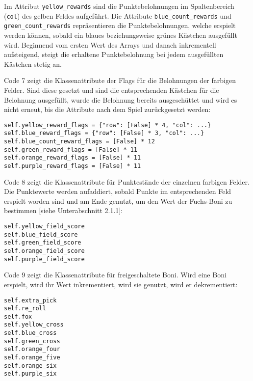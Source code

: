 Im Attribut \texttt{yellow\_rewards} sind die Punktebelohnungen im Spaltenbereich (\texttt{col}) des gelben Feldes aufgeführt. Die Attribute \texttt{blue\_count\_rewards} und \texttt{green\_count\_rewards} repräsentieren die Punktebelohnungen, welche erspielt werden können, sobald ein blaues beziehungsweise grünes Kästchen ausgefüllt wird. Beginnend vom ersten Wert des Arrays und danach inkrementell aufsteigend, steigt die erhaltene Punktebelohnung bei jedem ausgefüllten Kästchen stetig an.\\

\begin{minipage}{\linewidth}
Code 7 zeigt die Klassenattribute der Flags für die Belohnungen der farbigen Felder. Sind diese gesetzt und sind die entsprechenden Kästchen für die Belohnung ausgefüllt, wurde die Belohnung bereits ausgeschüttet und wird es nicht erneut, bis die Attribute nach dem Spiel zurückgesetzt werden:
\vspace{0.5cm}
\begin{lstlisting}[caption={Klassenattribute für Belohnungsflags}, basicstyle=\ttfamily]
self.yellow_reward_flags = {"row": [False] * 4, "col": ...}
self.blue_reward_flags = {"row": [False] * 3, "col": ...}
self.blue_count_reward_flags = [False] * 12
self.green_reward_flags = [False] * 11
self.orange_reward_flags = [False] * 11
self.purple_reward_flags = [False] * 11
\end{lstlisting}
\end{minipage}

\begin{minipage}{\linewidth}
Code 8 zeigt die Klassenattribute für Punktestände der einzelnen farbigen Felder. Die Punktewerte werden aufaddiert, sobald Punkte im entsprechenden Feld erspielt worden sind und am Ende genutzt, um den Wert der Fuchs-Boni zu bestimmen [siehe Unterabschnitt 2.1.1]:
\vspace{0.5cm}
\begin{lstlisting}[caption={Klassenattribute für erreichte Punktestände der einzelnen farbigen Felder}, basicstyle=\ttfamily]
self.yellow_field_score
self.blue_field_score
self.green_field_score
self.orange_field_score
self.purple_field_score
\end{lstlisting}
\end{minipage}

\begin{minipage}{\linewidth}
Code 9 zeigt die Klassenattribute für freigeschaltete Boni. Wird eine Boni erspielt, wird ihr Wert inkrementiert, wird sie genutzt, wird er dekrementiert:
\vspace{0.5cm}
\begin{lstlisting}[caption={Klassenattribute für freigespielte Boni}, basicstyle=\ttfamily]
self.extra_pick
self.re_roll
self.fox
self.yellow_cross
self.blue_cross
self.green_cross
self.orange_four
self.orange_five
self.orange_six
self.purple_six
\end{lstlisting}
\end{minipage}

